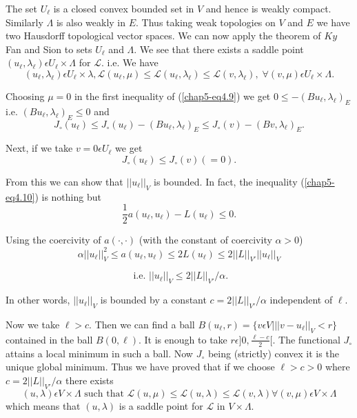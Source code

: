 The set $U_{\ell}$ is a closed convex bounded set in $V$ and hence is weakly compact. Similarly $\Lambda$ is also weakly in $E$. Thus taking weak topologies on $V$ and $E$ we have two Hausdorff topological vector spaces. We can now apply the theorem of $Ky$ Fan and Sion to sets $U_{\ell}$ and $\Lambda$. We see that there exists a saddle point $(u_{\ell}, \lambda_{\ell}) \epsilon U_{\ell} \times \Lambda$ for $\mathscr{L}$. i.e. We have
\begin{equation*}
(u_{\ell}, \lambda_{\ell}) \epsilon U_{\ell} \times \lambda, \mathscr{L} (u_{\ell}, \mu) \leq \mathscr{L} (u_{\ell}, \lambda_{\ell}) \leq \mathscr{L}(v, \lambda_{\ell}), \; \forall (v, \mu) \epsilon U_{\ell} \times \Lambda.\tag{4.9}\label{chap5-eq4.9}
\end{equation*}

Choosing $\mu = 0$ in the first inequality of (\ref{chap5-eq4.9}) we get $0 \leq -(Bu_{\ell}, \lambda_{\ell})_{E}$ i.e. $(Bu_{\ell}, \lambda_{\ell})_{E} \leq 0$ and
$$
J_{\circ}(u_{\ell}) \leq J_{\circ}(u_{\ell}) - (Bu_{\ell}, \lambda_{\ell})_{E} \leq J_{\circ}(v) - (Bv, \lambda_{\ell})_{E}.
$$

Next, if we take $v = 0 \epsilon U_{\ell}$ we get
\begin{equation*}
J_{\circ}(u_{\ell}) \leq J_{\circ}(v) (= 0).\tag{4.10}\label{chap5-eq4.10}
\end{equation*}

From this we can show that $||u_{\ell}||_{V}$ is bounded. In fact, the inequality (\ref{chap5-eq4.10}) is nothing but
$$
\frac{1}{2} a(u_{\ell}, u_{\ell}) - L(u_{\ell}) \leq 0.
$$\pageoriginale

Using the coercivity of $a(\cdot , \cdot)$ (with the constant of coercivity $\alpha > 0$)
$$
\alpha||u_{\ell}||_{V}^{2} \leq a(u_{\ell}, u_{\ell}) \leq 2L (u_{\ell}) \leq 2||L||_{V'} ||u_{\ell}||_{V}
$$

\begin{equation*}
\text{ i.e. } ||u_{\ell}||_{V} \leq 2||L||_{V'}/ \alpha.\tag{4.11}\label{chap5-eq4.11}
\end{equation*}

In other words, $||u_{\ell}||_{V}$ is bounded by a constant $c = 2||L||_{V'}/\alpha$ independent of $\ell$.

Now we take $\ell > c$. Then we can find a ball $B(u_{\ell}, r) = \{v \epsilon V | ||v-u_{\ell}||_{V} < r \}$ contained in the ball $B(0, \ell)$. It is enough to take $r \epsilon ]0, \frac{\ell - c}{2}[$. The functional $J_{\circ}$ attains a local minimum in such a ball. Now $J_{\circ}$ being (strictly) convex it is the unique global minimum. Thus we have proved that if we choose $\ell > c > 0$ where $c = 2||L||_{V'}/\alpha$ there exists
\begin{equation*}
(u, \lambda) \epsilon V \times \Lambda \text{ such that } \mathscr{L} (u, \mu) \leq \mathscr{L} (u, \lambda) \leq \mathscr{L}(v, \lambda) \forall (v, \mu) \epsilon V \times \Lambda\tag{4.12}\label{chap5-eq4.12}
\end{equation*} 
which means that $(u, \lambda)$ is a saddle point for $\mathscr{L}$ in $V \times \Lambda$.

